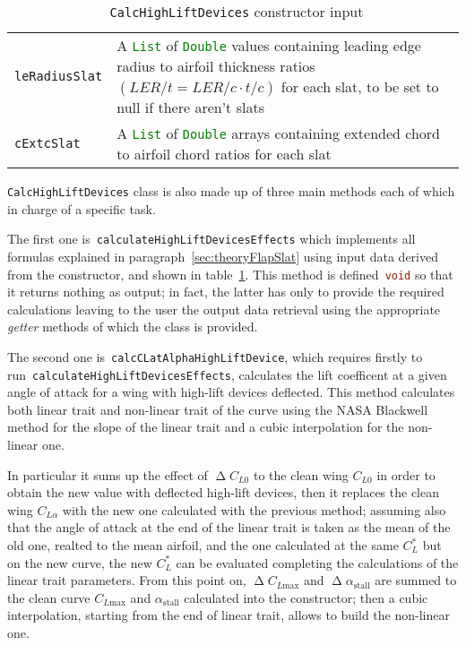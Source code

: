 \begin{table}[!t]
{\begin{tabular}{p{0.15\linewidth}p{0.85\linewidth}}
\lstinline[language=Java]!leRadiusSlat! & A \lstinline[language=Java]!List! of  \lstinline[language=Java]!Double! values containing leading edge radius to airfoil thickness ratios $\left(LER/t=LER/c\cdot t/c\right)$ for each slat, to be set to null if there aren't slats \\  [0.2cm]
\lstinline[language=Java]!cExtcSlat! & A \lstinline[language=Java]!List! of  \lstinline[language=Java]!Double! arrays containing extended chord to airfoil chord ratios for each slat \\ 
\bottomrule
\end{tabular}
}
\caption{~\lstinline[language=Java]!CalcHighLiftDevices! constructor input}
\label{table:CalcHighLiftConstructor}
\end{table}

\bigskip
\noindent
\lstinline[language=Java]!CalcHighLiftDevices! class is also made up of three main methods each of which in charge of a specific task. 

\noindent
The first one is~\lstinline[language=Java]!calculateHighLiftDevicesEffects! which implements all formulas explained in paragraph~\ref{sec:theoryFlapSlat} using input data derived from the constructor, and shown in table~\ref{table:CalcHighLiftConstructor}. This method is defined~\lstinline[language=Java]!void! so that it returns nothing as output; in fact, the latter has only to provide the required calculations leaving to the user the output data retrieval using the appropriate \emph{getter} methods of which the class is provided. 

\bigskip
\noindent
The second one is~\lstinline[language=Java]!calcCLatAlphaHighLiftDevice!, which requires firstly to run~\lstinline[language=Java]!calculateHighLiftDevicesEffects!, calculates the lift coefficent at a given angle of attack for a wing with high-lift devices deflected. This method calculates both linear trait and non-linear trait of the curve using the NASA Blackwell method for the slope of the linear trait and a cubic interpolation for the non-linear one. 

In particular it sums up the effect of $\upDelta C_{L0}$ to the clean wing $C_{L0}$ in order to obtain the new value with deflected high-lift devices, then it replaces the clean wing $C_{L\alpha}$ with the new one calculated with the previous method; assuming also that the angle of attack at the end of the linear trait is taken as the mean of the old one, realted to the mean airfoil, and the one calculated at the same $C_L^*$ but on the new curve, the new $C_L^*$  can be evaluated completing the calculations of the linear trait parameters. From this point on, $\upDelta C_{L\text{max}}$ and $\upDelta\alpha_{\text{stall}}$ are summed to the clean curve $C_{L\text{max}}$ and $\alpha_{\text{stall}}$ calculated into the constructor; then a cubic interpolation, starting from the end of linear trait, allows to build the non-linear one.

